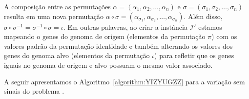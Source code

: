 A composição entre as permutações $\alpha=(\alpha_1,\alpha_2,\dots,\alpha_n)$ e $\sigma=(\sigma_1,\sigma_2,\dots,\sigma_n)$ resulta em uma nova permutação $\alpha \circ \sigma = (\alpha_{\sigma_1},\alpha_{\sigma_2},\dots,\alpha_{\sigma_n})$. Além disso, $\sigma \circ \sigma^{-1} = \sigma^{-1} \circ \sigma = \iota$. Em outras palavras, ao criar a instância $\mathcal{I'}$ estamos mapeando o genes do genoma de origem (elementos da permutação $\pi$) com os valores padrão da permutação identidade e também alterando os valores dos genes do genoma alvo (elementos da permutação $\iota$) para refletir que os genes iguais no genoma de origem e alvo possuam o mesmo valor associado.

A seguir apresentamos o Algoritmo~\ref{algorithm:YIZYUGZZ} para a variação sem sinais do problema \SbIRTI{}.



